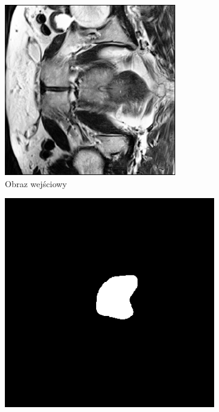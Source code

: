 \documentclass[a4paper,11pt,twoside]{report}
\theoremstyle{definition}
\begin{document}
\begin{figure}[htb]
	\medskip
	\begin{subfigure}{0.25\textwidth}
		\includegraphics[width=\linewidth,angle=270,origin=c]{segmentation/segmentation_train_2.png}
		\caption{Obraz wejściowy}
		\label{fig:4}
	\end{subfigure}\hfil %
	\begin{subfigure}{0.25\textwidth}
		\includegraphics[width=\linewidth,angle=270,origin=c]{segmentation/pred_mask_2.png}

\end{subfigure}
\end{figure}
\end{document}

